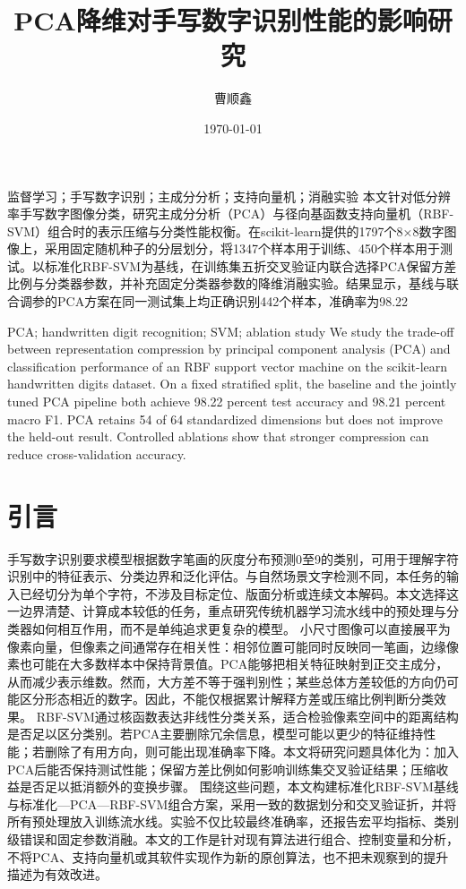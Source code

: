 \documentclass[supercite]{HustGSClassPaper}
\title{PCA降维对手写数字识别性能的影响研究}
\author{曹顺鑫}
\date{\today}
\begin{document}
\maketitle
\clearpage
{}
\begin{cnabstract}{监督学习；手写数字识别；主成分分析；支持向量机；消融实验}
本文针对低分辨率手写数字图像分类，研究主成分分析（PCA）与径向基函数支持向量机（RBF-SVM）组合时的表示压缩与分类性能权衡。在scikit-learn提供的1797个8×8数字图像上，采用固定随机种子的分层划分，将1347个样本用于训练、450个样本用于测试。以标准化RBF-SVM为基线，在训练集五折交叉验证内联合选择PCA保留方差比例与分类器参数，并补充固定分类器参数的降维消融实验。结果显示，基线与联合调参的PCA方案在同一测试集上均正确识别442个样本，准确率为98.22%
\end{cnabstract}
\begin{enabstract}{PCA; handwritten digit recognition; SVM; ablation study}
We study the trade-off between representation compression by principal component analysis (PCA) and classification performance of an RBF support vector machine on the scikit-learn handwritten digits dataset. On a fixed stratified split, the baseline and the jointly tuned PCA pipeline both achieve 98.22 percent test accuracy and 98.21 percent macro F1. PCA retains 54 of 64 standardized dimensions but does not improve the held-out result. Controlled ablations show that stronger compression can reduce cross-validation accuracy.\end{enabstract}
\tableofcontents
\clearpage
{}
\section{引言}
手写数字识别要求模型根据数字笔画的灰度分布预测0至9的类别，可用于理解字符识别中的特征表示、分类边界和泛化评估。与自然场景文字检测不同，本任务的输入已经切分为单个字符，不涉及目标定位、版面分析或连续文本解码。本文选择这一边界清楚、计算成本较低的任务，重点研究传统机器学习流水线中的预处理与分类器如何相互作用，而不是单纯追求更复杂的模型。
小尺寸图像可以直接展平为像素向量，但像素之间通常存在相关性：相邻位置可能同时反映同一笔画，边缘像素也可能在大多数样本中保持背景值。PCA能够把相关特征映射到正交主成分，从而减少表示维数。然而，大方差不等于强判别性；某些总体方差较低的方向仍可能区分形态相近的数字。因此，不能仅根据累计解释方差或压缩比例判断分类效果。
RBF-SVM通过核函数表达非线性分类关系，适合检验像素空间中的距离结构是否足以区分类别。若PCA主要删除冗余信息，模型可能以更少的特征维持性能；若删除了有用方向，则可能出现准确率下降。本文将研究问题具体化为：加入PCA后能否保持测试性能；保留方差比例如何影响训练集交叉验证结果；压缩收益是否足以抵消额外的变换步骤。
围绕这些问题，本文构建标准化RBF-SVM基线与标准化---PCA---RBF-SVM组合方案，采用一致的数据划分和交叉验证折，并将所有预处理放入训练流水线。实验不仅比较最终准确率，还报告宏平均指标、类别级错误和固定参数消融。本文的工作是针对现有算法进行组合、控制变量和分析，不将PCA、支持向量机或其软件实现作为新的原创算法，也不把未观察到的提升描述为有效改进。
\end{document}
